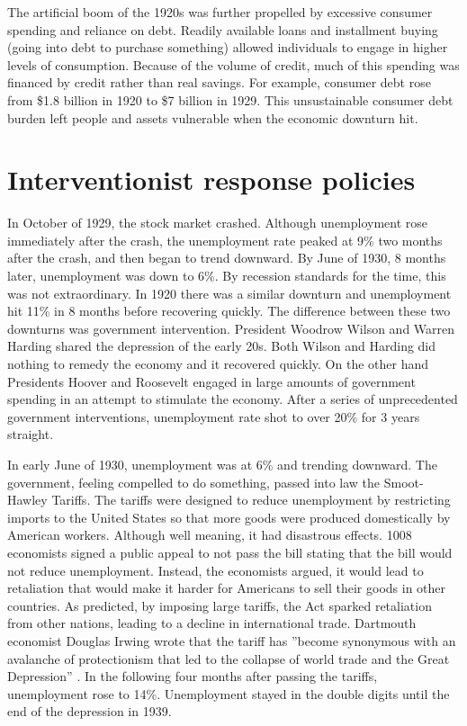\documentclass[12pt]{article}
\begin{document}
The artificial boom of the 1920s was further propelled by excessive consumer
spending and reliance on debt. Readily available loans and installment buying
(going into debt to purchase something) allowed individuals to engage in higher
levels of consumption. Because of the volume of credit, much of this spending
was financed by credit rather than real savings. For example, consumer debt
rose from \$1.8 billion in 1920 to \$7 billion in
1929\autocite{americaneconomy20s}. This unsustainable consumer debt burden left
people and assets vulnerable when the economic downturn hit.

\section{Interventionist response policies}

In October of 1929, the stock market crashed. Although unemployment rose
immediately after the crash, the unemployment rate peaked at 9\% two months
after the crash, and then began to trend downward. By June of 1930, 8 months
later, unemployment was down to 6\%\autocite{nber}. By recession standards for
the time, this was not extraordinary. In 1920 there was a similar downturn and
unemployment hit 11\%\autocite{nber} in 8 months before recovering quickly. The
difference between these two downturns was government intervention. President
Woodrow Wilson and Warren Harding shared the depression of the early 20s. Both
Wilson and Harding did nothing to remedy the economy and it recovered quickly.
On the other hand Presidents Hoover and Roosevelt engaged in large amounts of
government spending in an attempt to stimulate the economy. After a series of
unprecedented government interventions, unemployment rate shot to over
20\%\autocite{nber} for 3 years straight.

In early June of 1930, unemployment was at 6\% and trending downward. The
government, feeling compelled to do something, passed into law the Smoot-Hawley
Tariffs. The tariffs were designed to reduce unemployment by restricting
imports to the United States so that more goods were produced domestically by
American workers. Although well meaning, it had disastrous effects. 1008
economists signed a public appeal to not pass the bill stating that the bill
would not reduce unemployment\autocite{economistssmoothawley}. Instead, the
economists argued, it would lead to retaliation that would make it harder for
Americans to sell their goods in other countries. As predicted, by imposing
large tariffs, the Act sparked retaliation from other nations, leading to a
decline in international trade. Dartmouth economist Douglas Irwing wrote that
the tariff has ”become synonymous with an avalanche of protectionism that led
to the collapse of world trade and the Great Depression”
\autocite{peddlingprotectionism}. In the following four months after passing
the tariffs, unemployment rose to 14\%\autocite{nber}. Unemployment stayed in
the double digits until the end of the depression in 1939.
\end{document}
